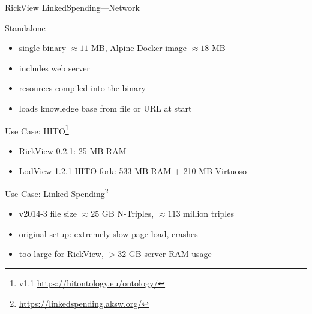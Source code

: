 \documentclass[14pt,aspectratio=169]{beamer}
\begin{document}
\begin{frame}[plain]{RickView LinkedSpending---Network}
\centering{}\\
\hspace{2em}
\centering{}
\end{frame}

\begin{frame}{Standalone}
\begin{itemize}
\item single binary $\approx 11$ MB, Alpine Docker image $\approx 18$ MB
\item includes web server
\item resources compiled into the binary
\item loads knowledge base from file or URL at start
\end{itemize}
\end{frame}

\begin{frame}{Use Case: HITO\footnote{v1.1 \url{https://hitontology.eu/ontology/}}}
\begin{itemize}
\item RickView 0.2.1: 25 MB RAM
\item LodView 1.2.1 HITO fork: 533 MB RAM + 210 MB Virtuoso
\end{itemize}
\end{frame}

\begin{frame}{Use Case: Linked Spending\footnote{\url{https://linkedspending.aksw.org/}}}
\begin{itemize}
\item v2014-3 file size $\approx 25$ GB N-Triples, $\approx 113$ million triples
\item original setup: extremely slow page load, crashes
\item too large for RickView, $> 32$ GB server RAM usage
\end{itemize}
\end{frame}
\end{document}
